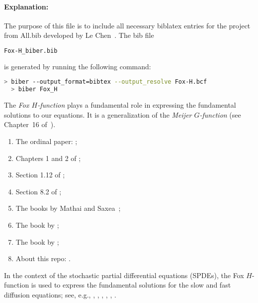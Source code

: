 \documentclass{article}
\begin{document}
\paragraph{Explanation:}


The purpose of this file is to include all necessary biblatex entries  for the
project  from All.bib developed by Le Chen~\cite{chen:23:spdes-bib}. The bib
file

\begin{lstlisting}[language=bash]
   Fox-H_biber.bib
\end{lstlisting}

is generated by running the following command:

\begin{lstlisting}[language=bash]
  > biber --output_format=bibtex --output_resolve Fox-H.bcf
  > biber Fox_H
\end{lstlisting}

The \textit{Fox $H$-function} plays a fundamental role in expressing the
fundamental solutions to our equations. It is a generalization of the
\textit{Meijer $G$-function} (see Chapter~16 of~\cite{olver.lozier.ea:10:nist}). 

\begin{enumerate}
  \item The ordinal paper: \cite{fox:61:g};
  \item Chapters 1 and 2 of \cite{kilbas.saigo:04:h-transforms};
  \item Section 1.12 of \cite{kilbas.srivastava.ea:06:theory};
  \item Section 8.2 of \cite{prudnikov.brychkov.ea:90:integrals};
  \item The books by Mathai and Saxea~\cite{mathai.saxena.ea:10:h-function,
    mathai.saxena:78:h-function};
  \item The book by \cite{eidelman.ivasyshen.ea:04:analytic};
  \item The book by \cite{erdelyi.magnus.ea:81:higher*1};
  \item About this repo: \cite{chen.hu:23:some}.
\end{enumerate}

In the context of the stochastic partial differential equations (SPDEs), the Fox
$H$-function is used to express the fundamental solutions for the slow and fast
diffusion equations; see, e.g., \cite{chen.hu.ea:17:space-time},
\cite{chen.hu.ea:19:nonlinear}, \cite{chen.eisenberg:22:interpolating},
\cite{chen.hu:22:holder}, \cite{chen.guo.ea:22:moments},
\cite{mijena.nane:15:space-time}.

\printbibliography[title={References}]
\end{document}
